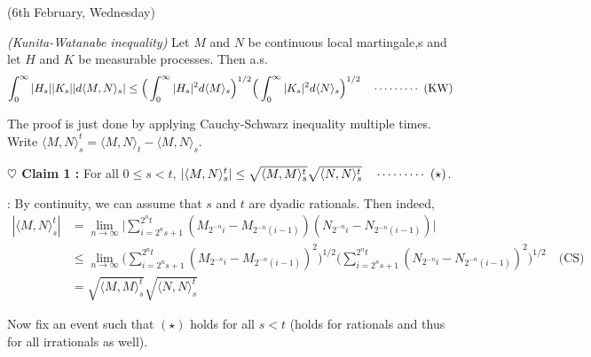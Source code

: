 \documentclass[12pt,a4paper]{article}
\newenvironment{proof}
{\begin{changemargin}{0.5cm}{0.5cm} 
	}%
	{\end{changemargin}
}
\newenvironment{subproof}
{\begin{changemargin}{0.5cm}{0.5cm} 
	}%
	{\end{changemargin}
}
\newenvironment{p}
{\begin{proof} 
	}%
	{\end{proof}
}
\begin{document}
\newday

(6th February, Wednesday)
\s

\prop \emph{(Kunita-Watanabe inequality)} Let $M$ and $N$ be continuous local martingale,s and let $H$ and $K$ be measurable processes. Then a.s.
\begin{align*}
\int_0^{\infty} |H_s| |K_s| |d\langle M, N\rangle_s| \leq \Big( \int_{0}^{\infty} |H_s|^2 d\langle M \rangle_s \Big)^{1/2} \Big( \int_{0}^{\infty} |K_s|^2 d\langle N \rangle_s \Big)^{1/2} \quad \cdots\cdots\cdots\,\,(\text{KW})
\end{align*}
\begin{p}
\pf The proof is just done by applying Cauchy-Schwarz inequality multiple times. Write $\langle M, N \rangle_s^t = \langle M, N \rangle_t - \langle M, N \rangle_s$.

\textbf{$\heartsuit$ Claim 1 :} For all $0\leq s <t$, $|\langle M, N \rangle_s^t| \leq \sqrt{\langle M, M \rangle_s^t} \sqrt{\langle N,N \rangle_s^t} \quad \cdots\cdots\cdots\,\,(\star)$.
\begin{subproof}
: By continuity, we can assume that $s$ and $t$ are dyadic rationals. Then indeed,
\begin{align*}
|\langle M, N \rangle_s^t| &= \lim_{n\rightarrow \infty} \Big| \sum_{i=2^n s+1}^{2^n t}(M_{2^{-n}i} -M_{2^{-n}(i-1)}) (N_{2^{-n}i} -N_{2^{-n}(i-1)})\Big| \\
&\leq \lim_{n\rightarrow \infty} \Big( \sum_{i=2^n s+1}^{2^n t} (M_{2^{-n}i} -M_{2^{-n}(i-1)})^2 \Big)^{1/2} \Big( \sum_{i=2^n s+1}^{2^n t} (N_{2^{-n}i} -N_{2^{-n}(i-1)})^2 \Big)^{1/2} \quad \text{(CS)} \\
&=\sqrt{\langle M, M \rangle_s^t} \sqrt{\langle N,N \rangle_s^t}
\end{align*}
\end{subproof}
Now fix an event such that $(\star)$ holds for all $s<t$ (holds for rationals and thus for all irrationals as well).


\end{p}
\end{document}
